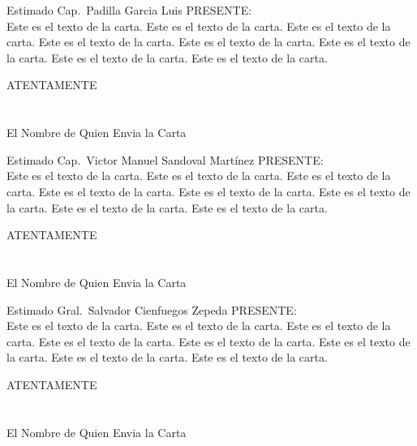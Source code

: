 \documentclass{article}
\def\cartapara#1#2{
Estimado #1\ #2
PRESENTE:\\
\indent Este es el texto de la carta. Este es el texto de la carta. 
Este es el texto de la carta. Este es el texto de la carta. 
Este es el texto de la carta. Este es el texto de la carta. 
Este es el texto de la carta. 
Este es el texto de la carta. 
\begin{center}
ATENTAMENTE\\
\ \\
\ \\
El Nombre de Quien Envia la Carta
\end{center}
}
\begin{document}
\cartapara{Cap.}{Padilla Garcia Luis}
\eject
\cartapara{Cap.}{Victor Manuel Sandoval Martínez}
\eject
\cartapara{Gral.}{Salvador Cienfuegos Zepeda}
\end{document}

